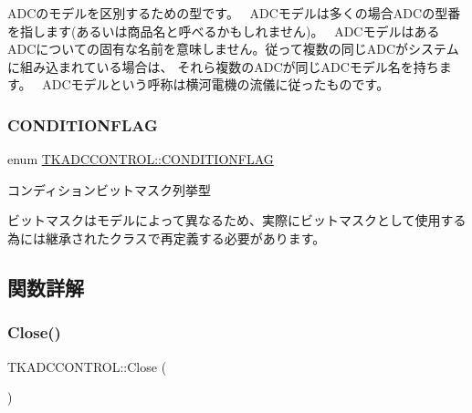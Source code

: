 A\+D\+Cのモデルを区別するための型です。~\newline
 A\+D\+Cモデルは多くの場合\+A\+D\+Cの型番を指します(あるいは商品名と呼べるかもしれません)。~\newline
 A\+D\+Cモデルはある\+A\+D\+Cについての固有な名前を意味しません。従って複数の同じ\+A\+D\+Cがシステムに組み込まれている場合は、 それら複数の\+A\+D\+Cが同じ\+A\+D\+Cモデル名を持ちます。~\newline
 A\+D\+Cモデルという呼称は横河電機の流儀に従ったものです。 \mbox{\label{class_t_k_a_d_c_c_o_n_t_r_o_l_a4ec8bb3e68a489f7a757d08a855ffb61}} 
\subsubsection{\texorpdfstring{C\+O\+N\+D\+I\+T\+I\+O\+N\+F\+L\+AG}{CONDITIONFLAG}}
{\footnotesize\ttfamily enum \hyperlink{class_t_k_a_d_c_c_o_n_t_r_o_l_a4ec8bb3e68a489f7a757d08a855ffb61}{T\+K\+A\+D\+C\+C\+O\+N\+T\+R\+O\+L\+::\+C\+O\+N\+D\+I\+T\+I\+O\+N\+F\+L\+AG}\hspace{0.3cm}{\ttfamily [strong]}}

コンディションビットマスク列挙型

ビットマスクはモデルによって異なるため、実際にビットマスクとして使用する為には継承されたクラスで再定義する必要があります。 

\subsection{関数詳解}
\mbox{\label{class_t_k_a_d_c_c_o_n_t_r_o_l_a2f8903ef41b5b97ddf2d2f08a5374402}} 
\subsubsection{\texorpdfstring{Close()}{Close()}}
{\footnotesize\ttfamily T\+K\+A\+D\+C\+C\+O\+N\+T\+R\+O\+L\+::\+Close (\begin{DoxyParamCaption}{ }\end{DoxyParamCaption})}

